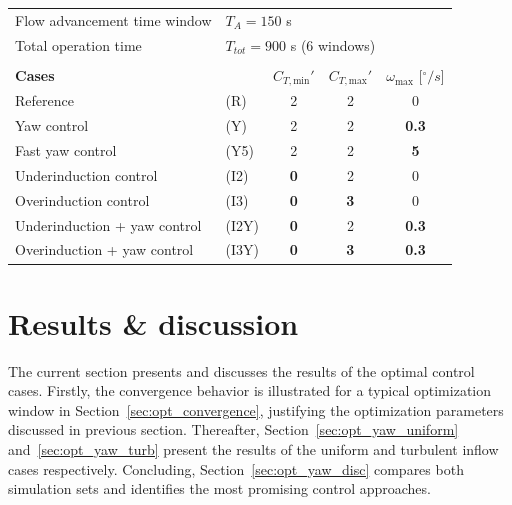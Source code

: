 \documentclass[energies,article,submit,moreauthors,latex,10pt,a4paper]{mdpi}
\begin{document}
\begin{table}
\begin{tabular}{llccc}
		Flow advancement time window 	& \multicolumn{4}{l}{$T_A = 150$ s}\\
		Total operation time         	& \multicolumn{4}{l}{$T_{tot} = 900$ s (6 windows)}\\
		& & & & \\	
		\toprule
		\textbf{Cases} & \  & $C_{T,\text{min}}'$ & $C_{T,\text{max}}'$ & $\omega_{\text{max}}$ [$^\circ/s$] \\ 
		\toprule
		Reference & (R)    &  2 & 2 & 0   \\ 
		Yaw control & (Y)   &  2 & 2 & \textbf{0.3} \\ 
		Fast yaw control & (Y5)   &  2 & 2 &\textbf{5}   \\ 
		Underinduction control & (I2)    &  \textbf{0} & 2 & 0\\
		Overinduction control & (I3)    &  \textbf{0} & \textbf{3} & 0\\ 
		Underinduction + yaw control & (I2Y)   &  \textbf{0} & 2 & \textbf{0.3} \\ 
		Overinduction + yaw control & (I3Y)   &  \textbf{0} & \textbf{3} & \textbf{0.3} \\ 
		\bottomrule
	\end{tabular} 
\end{table}

\section{Results \& discussion}\label{sec:opt_yaw_results}
\noindent The current section presents and discusses the results of the optimal control cases. Firstly, the convergence behavior is illustrated for a typical optimization window in Section~\ref{sec:opt_convergence}, justifying the optimization parameters discussed in previous section. Thereafter, Section~\ref{sec:opt_yaw_uniform} and~\ref{sec:opt_yaw_turb} present the results of the uniform and turbulent inflow cases respectively. Concluding, Section~\ref{sec:opt_yaw_disc} compares both simulation sets and identifies the most promising control approaches.
\end{document}
